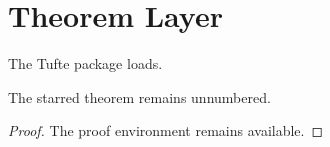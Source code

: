 \documentclass{article}
\begin{document}
\section{Theorem Layer}
\begin{theorem}The Tufte package loads.\end{theorem}
\begin{theorem*}The starred theorem remains unnumbered.\end{theorem*}
\begin{proof}The proof environment remains available.\end{proof}
\end{document}
